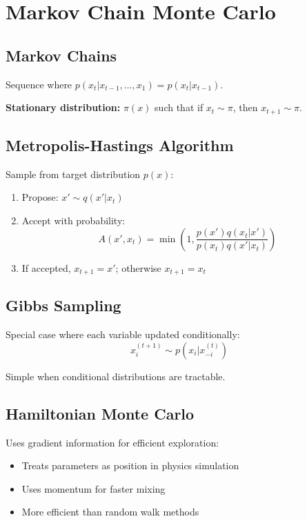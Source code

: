 
\section{Markov Chain Monte Carlo}
\label{sec:mcmc}

\subsection{Markov Chains}

Sequence where $p(x_t|x_{t-1}, \ldots, x_1) = p(x_t|x_{t-1})$.

\textbf{Stationary distribution:} $\pi(x)$ such that if $x_t \sim \pi$, then $x_{t+1} \sim \pi$.

\subsection{Metropolis-Hastings Algorithm}

Sample from target distribution $p(x)$:
\begin{enumerate}
    \item Propose: $x' \sim q(x'|x_t)$
    \item Accept with probability:
    \begin{equation}
    A(x', x_t) = \min\left(1, \frac{p(x')q(x_t|x')}{p(x_t)q(x'|x_t)}\right)
    \end{equation}
    \item If accepted, $x_{t+1} = x'$; otherwise $x_{t+1} = x_t$
\end{enumerate}

\subsection{Gibbs Sampling}

Special case where each variable updated conditionally:
\begin{equation}
x_i^{(t+1)} \sim p(x_i | x_{-i}^{(t)})
\end{equation}

Simple when conditional distributions are tractable.

\subsection{Hamiltonian Monte Carlo}

Uses gradient information for efficient exploration:
\begin{itemize}
    \item Treats parameters as position in physics simulation
    \item Uses momentum for faster mixing
    \item More efficient than random walk methods
\end{itemize}

